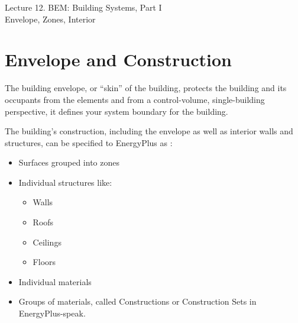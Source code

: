 \documentclass[10pt]{article}
\begin{document}
   \noindent
   \begin{center}

   \hrulefill
   
   \vspace{5pt}
   
   \vspace{0pt}
   
   {\Large \hfill  Lecture 12. BEM: Building Systems, Part I\\ \hfill {\large Envelope, Zones, Interior}}
   \vspace{5pt}
   
  
   \hrulefill
   \end{center}

{}



\section{Envelope and Construction}

The building envelope, or ``skin'' of the building, protects the building and its occupants from the elements and from a control-volume, single-building perspective, it defines your system boundary for the building. 

The building's construction, including the envelope as well as interior walls and structures, can be specified to EnergyPlus as \cite{EPcourseteaching}:

\vspace{-6pt}
\begin{itemize}
    \setlength{\itemsep}{0pt}%
    \setlength{\parskip}{0pt}%
    \item Surfaces grouped into zones
    \item Individual structures like:
        \begin{itemize}
            \setlength{\itemsep}{0pt}%
            \setlength{\parskip}{0pt}%
            \item Walls
            \item Roofs
            \item Ceilings
            \item Floors
        \end{itemize}
        \item Individual materials
        \item Groups of materials, called Constructions or Construction Sets in EnergyPlus-speak.
\end{itemize}
\vspace{-6pt}
\end{document}
